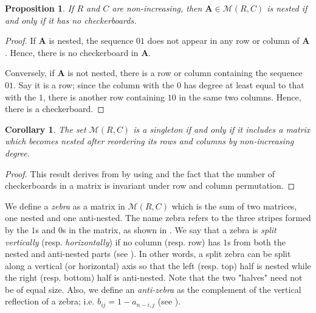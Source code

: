 \documentclass{article}
\newtheorem{prop}{Proposition}
\newtheorem{corollary}{Corollary}
\newcommand{\MM}{\mathcal M}
\newcommand{\A}{\mathbf A}
\begin{document}
\begin{prop}\label{nested}
If $R$ and $C$ are non-increasing, then $\A\in\MM(R,C)$ is nested if and only if it has no checkerboards. 
\end{prop}

\begin{proof}
If $\A$ is nested, the sequence $01$ does not appear in any row or column of $\A$. Hence, there is no checkerboard in $\A$.

Conversely, if $\A$ is not nested, there is a row or column containing the sequence $01$. Say it is a row; since the column with the $0$ has degree at least equal to that with the $1$, there is another row containing $10$ in the same two columns. Hence, there is a checkerboard.
\end{proof}

\begin{corollary}\label{singleton}
The set $\MM(R,C)$ is a singleton if and only if it includes a matrix which becomes nested after reordering its rows and columns by non-increasing degree.
\end{corollary}

\begin{proof}
This result derives from  by using  and the fact that the number of checkerboards in a matrix is invariant under row and column permutation.
\end{proof}





We define a \emph{zebra} as a matrix in $\MM(R,C)$ which is the sum of two matrices, one nested and one anti-nested. The name zebra refers to the three stripes formed by the $1$s and $0$s in the matrix, as shown in . We say that a zebra is \emph{split vertically} (resp. \emph{horizontally}) if no column (resp. row) has $1$s from both the nested and anti-nested parts (see ). In other words, a split zebra can be split along a vertical (or horizontal) axis so that the left (resp. top) half is nested while the right (resp. bottom) half is anti-nested. Note that the two "halves" need not be of equal size. Also, we define an \emph{anti-zebra} as the complement of the vertical reflection of a zebra; i.e. $b_{ij}=1-a_{n-i,j}$ (see ).
\end{document}
